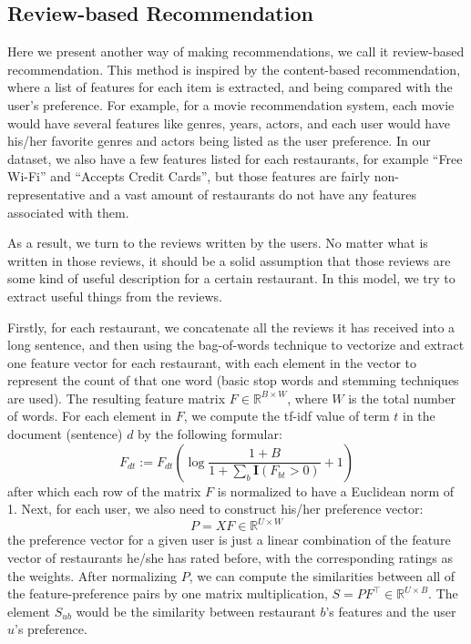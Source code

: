 \documentclass[conference]{IEEEtran}
\begin{document}
\subsection{Review-based Recommendation}
Here we present another way of making recommendations, we call it
review-based recommendation. This method is inspired by the content-based
recommendation, where a list of features for each item is extracted, and
being compared with the user's preference. For example, for a movie
recommendation system, each movie would have several features like
genres, years, actors, and each user would have his/her favorite 
genres and actors being listed as the user preference.
In our dataset, we also have a few features listed for each restaurants,
for example ``Free Wi-Fi'' and ``Accepts Credit Cards'', but those features
are fairly non-representative and a vast amount of restaurants do not have 
any features associated with them.
\par
As a result, we turn to the reviews written by the users. No matter what 
is written in those reviews, it should be a solid assumption that those
reviews are some kind of useful description for a certain restaurant. In this model, we try to extract useful things from the reviews.
\par
Firstly, for each restaurant, we concatenate all the reviews it has received
into a long sentence, and then using the bag-of-words technique to 
vectorize and extract one feature vector for each restaurant, with each 
element in the vector to represent the count of that one word (basic 
stop words and stemming techniques are used). The resulting feature matrix 
$F \in \mathbb R^{B \times W}$, where $W$ is the total number of words. For each element in $F$, we compute the tf-idf value of term $t$
in the document (sentence) $d$ by the following formular:
\[
F_{dt} := F_{dt} \left(
\log\frac{1 + B}{1 + \sum_b \mathbf{I}(F_{bt} > 0)} +  1
\right)
\]
after which each row of the matrix $F$ is normalized to have 
a Euclidean norm of 1.
Next, for
each user, we also need to construct his/her preference vector:
\[
P = XF \in \mathbb R^{U \times W}
\]
the preference vector for a given user 
is just a linear combination of the feature vector of 
restaurants he/she has rated before, with the corresponding ratings as the
weights. After normalizing $P$, we can compute the similarities between
all of the feature-preference pairs by one matrix multiplication, 
$S = PF^{\top} \in \mathbb R^{U \times B}$.
The element $S_{ub}$ would be the similarity between restaurant $b$'s
features and the user $u$'s preference.
\end{document}
